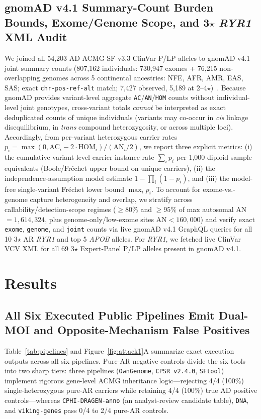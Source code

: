 \documentclass[11pt,letterpaper]{article}
\begin{document}
\subsection{gnomAD v4.1 Summary-Count Burden Bounds, Exome/Genome Scope, and 3$\star$ \textit{RYR1} XML Audit}
We joined all 54,203 AD ACMG SF v3.3 ClinVar P/LP alleles to gnomAD v4.1 joint summary counts (807,162 individuals: 730,947 exomes + 76,215 non-overlapping genomes across 5 continental ancestries: NFE, AFR, AMR, EAS, SAS; exact \texttt{chr-pos-ref-alt} match; 7,427 observed, 5,189 at 2--4$\star$)~\citep{chen2024gnomadv3,gnomadv41release2024}. Because gnomAD provides variant-level aggregate \texttt{AC}/\texttt{AN}/\texttt{HOM} counts without individual-level joint genotypes, cross-variant totals \emph{cannot} be interpreted as exact deduplicated counts of unique individuals (variants may co-occur in \textit{cis} linkage disequilibrium, in \textit{trans} compound heterozygosity, or across multiple loci). Accordingly, from per-variant heterozygous carrier rates $p_i = \max(0, \text{AC}_i - 2\cdot\text{HOM}_i)/(\text{AN}_i/2)$, we report three explicit metrics: (i) the cumulative variant-level carrier-instance rate $\sum_i p_i$ per 1,000 diploid sample-equivalents (Boole/Fr\'{e}chet upper bound on unique carriers), (ii) the independence-assumption model estimate $1 - \prod_i (1 - p_i)$, and (iii) the model-free single-variant Fr\'{e}chet lower bound $\max_i p_i$. To account for exome-vs.-genome capture heterogeneity and overlap, we stratify across callability/detection-scope regimes ($\ge 80\%$ and $\ge 95\%$ of max autosomal AN $= 1{,}614{,}324$, plus genome-only/low-exome sites $\text{AN} < 160{,}000$) and verify exact \texttt{exome}, \texttt{genome}, and \texttt{joint} counts via live gnomAD v4.1 GraphQL queries for all 10 3$\star$ AR \textit{RYR1} and top 5 \textit{APOB} alleles. For \textit{RYR1}, we fetched live ClinVar VCV XML for all 69 3$\star$ Expert-Panel P/LP alleles present in gnomAD v4.1.

\section{Results}
\subsection{All Six Executed Public Pipelines Emit Dual-MOI and Opposite-Mechanism False Positives}
Table~\ref{tab:pipelines} and Figure~\ref{fig:attack1}A summarize exact execution outputs across all six pipelines. Pure-AR negative controls divide the six tools into two sharp tiers: three pipelines (\texttt{OwnGenome}, \texttt{CPSR v2.4.0}, \texttt{SFtool}) implement rigorous gene-level ACMG inheritance logic---rejecting 4/4 (100\%) single-heterozygous pure-AR carriers while retaining 4/4 (100\%) true AD positive controls---whereas \texttt{CPHI-DRAGEN-anno} (an analyst-review candidate table), \texttt{DNA}, and \texttt{viking-genes} pass 0/4 to 2/4 pure-AR controls.
\end{document}
